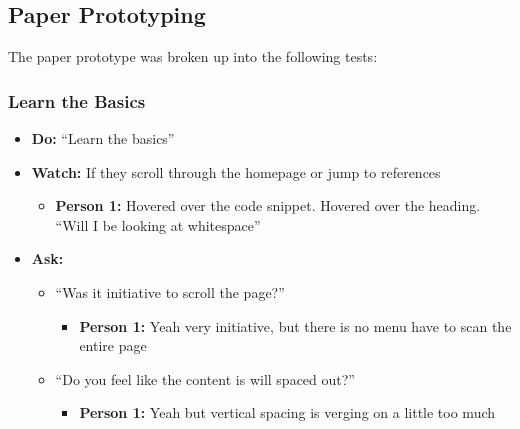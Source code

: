 \subsection{Paper Prototyping}
The paper prototype was broken up into the following tests:

\subsubsection{Learn the Basics}
\begin{itemize}
	\item\textbf{Do:} ``Learn the basics''
	\item\textbf{Watch:} If they scroll through the homepage or jump to references
	\begin{itemize}
		\item\textbf{Person 1:} Hovered over the code snippet. Hovered over the heading. ``Will I be looking at whitespace''
	\end{itemize}
	\item\textbf{Ask:}
	\begin{itemize}
		\item ``Was it initiative to scroll	the page?''
		\begin{itemize}
			\item\textbf{Person 1:} Yeah very initiative, but there is no menu have to scan the entire page
		\end{itemize}
		\item ``Do you feel like the content is will spaced out?''
		\begin{itemize}
			\item\textbf{Person 1:} Yeah but vertical spacing is verging on a little too much
		\end{itemize}
	\end{itemize}
\end{itemize}


